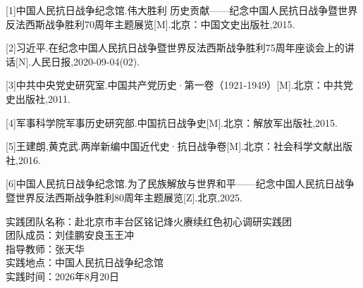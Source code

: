 \documentclass[a4paper,12pt]{article}
\begin{document}
\noindent\songti{}
\setlength{\baselineskip}{22pt}
[1]中国人民抗日战争纪念馆.伟大胜利 历史贡献——纪念中国人民抗日战争暨世界反法西斯战争胜利70周年主题展览[M].北京：中国文史出版社,2015.

[2]习近平.在纪念中国人民抗日战争暨世界反法西斯战争胜利75周年座谈会上的讲话[N].人民日报,2020-09-04(02).

[3]中共中央党史研究室.中国共产党历史·第一卷（1921-1949）[M].北京：中共党史出版社,2011.

[4]军事科学院军事历史研究部.中国抗日战争史[M].北京：解放军出版社,2015.

[5]王建朗,黄克武.两岸新编中国近代史·抗日战争卷[M].北京：社会科学文献出版社,2016.

[6]中国人民抗日战争纪念馆.为了民族解放与世界和平——纪念中国人民抗日战争暨世界反法西斯战争胜利80周年主题展览[Z].北京,2025.

\vspace{22pt}

\begin{flushright}
\songti{}
实践团队名称：赴北京市丰台区铭记烽火赓续红色初心调研实践团\\
团队成员：刘佳鹏\quad 安良玉\quad 王冲\\
指导教师：张天华\\
实践地点：中国人民抗日战争纪念馆\\
实践时间：2026年8月20日
\end{flushright}
\end{document}
